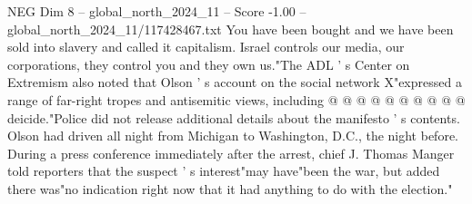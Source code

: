 \begin{textsample}{NEG Dim 8 – global\_north\_2024\_11 – Score -1.00 – global\_north\_2024\_11/117428467.txt}
You have been bought and we have been sold into slavery and called it capitalism.
Israel controls our media, our corporations, they control you and they own us."The ADL ' s Center on Extremism also noted that Olson ' s account on the social network X"expressed a range of far-right tropes and antisemitic views, including @ @ @ @ @ @ @ @ @ @ deicide."Police did not release additional details about the manifesto ' s contents.
Olson had driven all night from Michigan to Washington, D.C., the night before.
During a press conference immediately after the arrest, chief J.
Thomas Manger told reporters that the suspect ' s interest"may have"been the war, but added there was"no indication right now that it had anything to do with the election."

\end{textsample}
